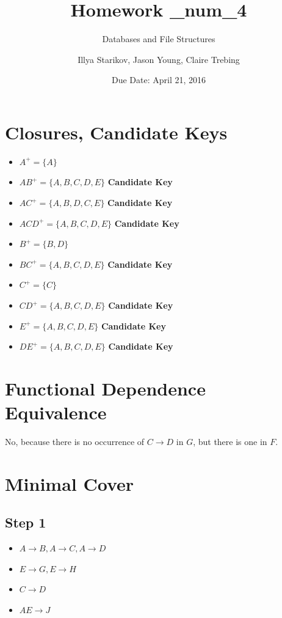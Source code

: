 \documentclass{scrartcl}
\title{Homework \_num_4}
\subtitle{Databases and File Structures}
\date{Due Date: April 21, 2016}
\author{Illya Starikov, Jason Young, Claire Trebing}
\begin{document}
\maketitle

\section{Closures, Candidate Keys}
\begin{itemize}
    \item $A^+ = \{ A \}$
    \item $AB^+ = \{ A, B, C, D, E \}$ \textbf{Candidate Key}
    \item $AC^+ = \{ A, B, D, C, E \}$ \textbf{Candidate Key}
    \item $ACD^+ = \{ A, B, C, D, E \}$ \textbf{Candidate Key}
    \item $B^+ = \{ B, D \}$
    \item $BC^+ = \{ A, B, C, D, E\}$ \textbf{Candidate Key}
    \item $C^+ = \{ C \}$
    \item $CD^+ = \{ A, B, C, D, E \}$ \textbf{Candidate Key}
    \item $E^+ = \{ A, B, C, D, E \}$ \textbf{Candidate Key}
    \item $DE^+ = \{ A, B, C, D, E \}$ \textbf{Candidate Key}
\end{itemize}

\section{Functional Dependence Equivalence}
No, because there is no occurrence of $C \rightarrow D$ in $G$, but there is one in $F$.


\section{Minimal Cover}
\subsection*{Step 1}
\begin{itemize}
    \item $A \rightarrow B, A \rightarrow C, A \rightarrow D$
    \item $E \rightarrow G, E \rightarrow H$
    \item $C \rightarrow D$
    \item $AE \rightarrow J$
\end{itemize}
\end{document}
